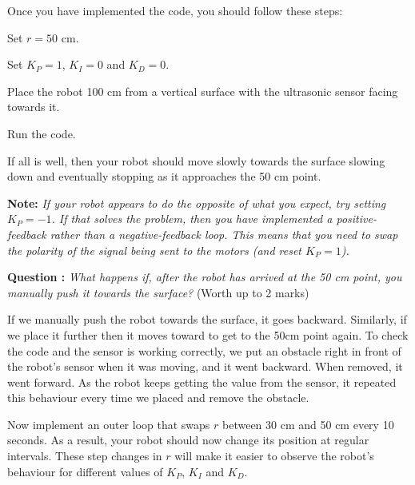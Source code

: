 \documentclass[hidelinks,a4paper,11pt]{article}
\newcounter{question}
\newcommand\myq{\refstepcounter{question}\thequestion}
\begin{document}
	Once you have implemented the code, you should follow these steps:
	\begin{todolist}
		\item Set $r=50$ cm.
		\item Set $K_P=1$, $K_I=0$ and $K_D=0$.
		\item Place the robot 100 cm from a vertical surface with the ultrasonic sensor facing towards it.
		\item Run the code.
	\end{todolist}
	
	If all is well, then your robot should move slowly towards the surface slowing down and eventually stopping as it approaches the 50 cm point.
	
	{\bfseries Note:}  \emph{If your robot appears to do the opposite of what you expect, try setting $K_P=-1$.  If that solves the problem, then you have implemented a positive-feedback rather than a negative-feedback loop.  This means that you need to swap the polarity of the signal being sent to the motors (and reset $K_P=1$).}
	
	{\bfseries Question \myq:}  \emph{What happens if, after the robot has arrived at the 50 cm point, you manually push it towards the surface?} (Worth up to 2 marks)\\
	\begin{mdframed}
		If we manually push the robot towards the surface, it goes backward. Similarly, if we place it further then it moves toward to get to the 50cm point again. To check the code and the sensor is working correctly, we put an obstacle right in front of the robot’s sensor when it was moving, and it went backward. When removed, it went forward. As the robot keeps getting the value from the sensor, it repeated this behaviour every time we placed and remove the obstacle.
	\end{mdframed}
	\vspace*{\baselineskip}
	
	Now implement an outer loop that swaps $r$ between 30 cm and 50 cm every 10 seconds.  As a result, your robot should now change its position at regular intervals.  These step changes in $r$ will make it easier to observe the robot's behaviour for different values of $K_P$, $K_I$ and $K_D$.
	
\end{document}
